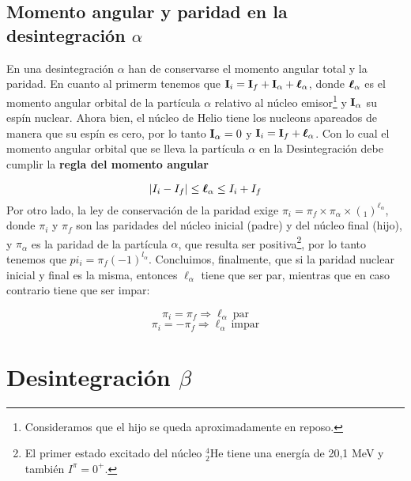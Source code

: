
\subsection{Momento angular y paridad en la desintegración $\alpha$}

En una desintegración $\alpha$ han de conservarse el momento angular total y la paridad. En cuanto al primerm tenemos que $\mathbf{I}_i = \mathbf{I}_f + \mathbf{I}_\alpha + \boldsymbol{\ell}_\alpha$, donde $\boldsymbol{\ell}_\alpha$ es el momento angular orbital de la partícula $\alpha$ relativo al núcleo emisor\footnote{Consideramos que el hijo se queda aproximadamente en reposo.} y $\mathbf{I}_\alpha$ su espín nuclear. Ahora bien, el núcleo de Helio tiene los nucleons apareados de manera que su espín es cero, por lo tanto $\mathbf{I}_\alpha  =0$ y $\mathbf{I}_i = \mathbf{I}_f + \boldsymbol{\ell}_\alpha$. Con lo cual el momento angular orbital que se lleva la partícula $\alpha$ en la Desintegración debe cumplir la \textbf{regla del momento angular}

\begin{equation}
    |I_i-I_f|\leq \boldsymbol{\ell}_\alpha \leq I_i + I_f
\end{equation}
Por otro lado, la ley de conservación de la paridad exige $\pi_i=\pi_f \times \pi_\alpha \times (_1)^{\ell_\alpha}$, donde $\pi_i$ y $\pi_f$ son las paridades del núcleo inicial (padre) y del núcleo final (hijo), y $\pi_\alpha$ es la paridad de la partícula $\alpha$, que resulta ser positiva\footnote{El primer estado excitado del núcleo $^4_2$He tiene una energía de 20,1 MeV y también $I^\pi = 0^+$.}, por lo tanto tenemos que $pi_i = \pi_f (-1)^{l_\alpha}$. Concluimos, finalmente, que si la paridad nuclear inicial y final es la misma, entonces $\ell_\alpha$ tiene que ser par, mientras que en caso contrario tiene que ser impar:

\begin{equation}
    \pi_i = \pi_f \Longrightarrow \ell_\alpha \ \text{par}
\end{equation}
\begin{equation*}
    \pi_i = - \pi_f \Longrightarrow \ell_\alpha \ \text{impar}
\end{equation*}



\section{Desintegración $\beta$}

